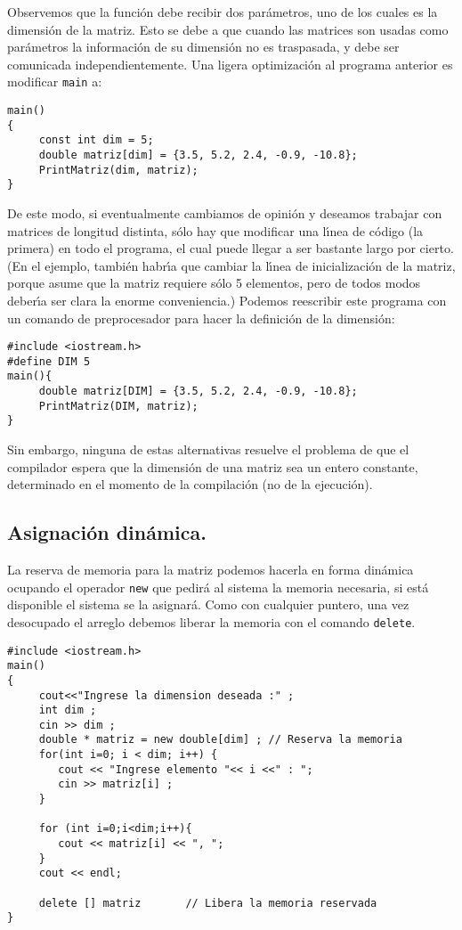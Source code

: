 Observemos que la funci{\'o}n debe recibir dos par{\'a}metros, uno de los
cuales es la dimensi{\'o}n de la matriz. Esto se debe a que cuando las
matrices son usadas como par{\'a}metros la informaci{\'o}n de su
dimensi{\'o}n no es traspasada, y debe ser comunicada
independientemente. Una ligera optimizaci{\'o}n al programa anterior es
modificar \verb+main+ a:
\begin{verbatim}
main()
{
     const int dim = 5;
     double matriz[dim] = {3.5, 5.2, 2.4, -0.9, -10.8};
     PrintMatriz(dim, matriz);
}
\end{verbatim}
De este modo, si eventualmente cambiamos de opini{\'o}n y deseamos
trabajar con matrices de longitud distinta, s{\'o}lo hay que modificar
una l{\'\i}nea de c{\'o}digo (la primera) en todo el programa, el cual
puede llegar a ser bastante largo por cierto. (En el ejemplo,
tambi{\'e}n habr{\'\i}a que cambiar la l{\'\i}nea de inicializaci{\'o}n
de la matriz, porque asume que la matriz requiere s{\'o}lo 5 elementos,
pero de todos modos deber{\'\i}a ser clara la enorme conveniencia.)
Podemos reescribir este programa con un comando de preprocesador para
hacer la definici{\'o}n de la dimensi{\'o}n:
\begin{verbatim}
#include <iostream.h>
#define DIM 5
main(){
     double matriz[DIM] = {3.5, 5.2, 2.4, -0.9, -10.8};
     PrintMatriz(DIM, matriz);
}
\end{verbatim}

Sin embargo, ninguna de estas alternativas resuelve el problema de que
el compilador espera que la dimensi\'on de una matriz sea un entero 
constante, determinado en el momento de la compilaci\'on (no de la
ejecuci\'on).

\subsection{Asignaci{\'o}n din{\'a}mica.}

La reserva de memoria para la matriz podemos hacerla en forma din{\'a}mica
ocupando el operador \verb|new| que pedir{\'a} al sistema la memoria
necesaria, si est{\'a} disponible el sistema se la asignar{\'a}. Como
con cualquier puntero,
una vez desocupado el arreglo debemos liberar la memoria con el
comando \verb|delete|.
\begin{verbatim}
#include <iostream.h>
main()
{
     cout<<"Ingrese la dimension deseada :" ;
     int dim ;
     cin >> dim ;
     double * matriz = new double[dim] ; // Reserva la memoria
     for(int i=0; i < dim; i++) {
        cout << "Ingrese elemento "<< i <<" : ";
        cin >> matriz[i] ;
     } 

     for (int i=0;i<dim;i++){
        cout << matriz[i] << ", ";
     } 
     cout << endl;

     delete [] matriz       // Libera la memoria reservada 
}
\end{verbatim}
 
